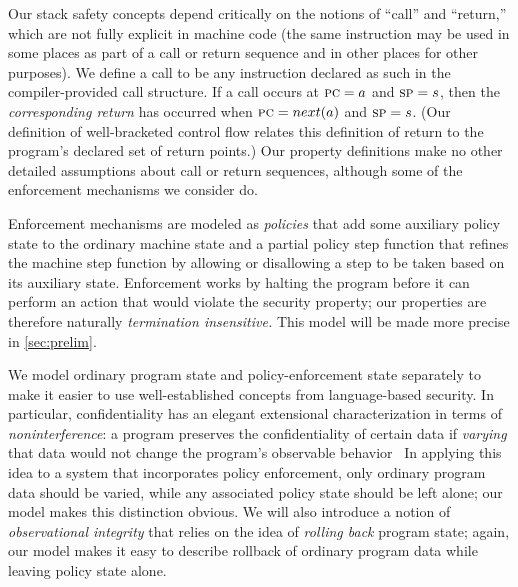 \documentclass[acmsmall,review,anonymous]{acmart}\settopmatter{printfolios=true,printccs=false,printacmref=false}
\begin{document}
Our stack safety concepts depend critically on the notions of ``call'' and ``return,''
which are not fully explicit in machine code (the same instruction may be
used in some places as part of a call or return sequence and in other places
for other purposes).  We define a call to be
any instruction declared as such in the compiler-provided call structure.
If a call occurs at $\textsc{pc} = a$ and $\textsc{sp} = s$, then the \emph{corresponding
  return} has occurred when $\textsc{pc} = next(a)$ and $\textsc{sp} = s$. (Our definition
of well-bracketed control flow relates this definition of return to the program's
declared set of return points.)
Our property definitions make no other detailed assumptions about call or return sequences, although
some of the enforcement mechanisms we consider do.

Enforcement mechanisms are modeled as {\em policies} that add some auxiliary
policy state to the ordinary machine state
and a partial policy step function that refines the machine step
function by allowing or disallowing a step to be taken based on its
auxiliary state.  Enforcement works by halting the program before it
can perform an action that would violate the security property; our
properties are therefore naturally \emph{termination insensitive.}
This model will be made more precise in \cref{sec:prelim}.

We model ordinary program state and policy-enforcement state separately to make it
easier to use well-established concepts from language-based security.
In particular, confidentiality has an elegant extensional characterization in terms of
\emph{noninterference}: a program preserves the confidentiality of certain data if
\emph{varying} that data would not change the program's observable
behavior~\citep{6234468}
In applying this idea to a system that incorporates policy enforcement, only
ordinary program data should be varied, while any associated policy
state should be left alone; our model makes this distinction obvious.
We will also introduce a notion of {\em observational integrity} that relies on the idea of
\emph{rolling back} program state; again, our model makes it easy to describe
rollback of ordinary program data while leaving policy state alone.
\end{document}
